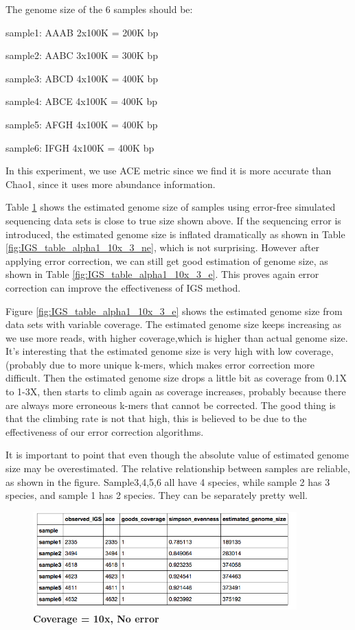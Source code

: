 \documentclass{article}
\begin{document}
The genome size of the 6 samples should be:

sample1: AAAB 2x100K = 200K bp

sample2: AABC 3x100K = 300K bp

sample3: ABCD 4x100K = 400K bp

sample4: ABCE 4x100K = 400K bp

sample5: AFGH 4x100K = 400K bp

sample6: IFGH 4x100K = 400K bp

In this experiment, we use ACE metric since we find it is more accurate than Chao1, since it uses more abundance information.

Table \ref{fig:IGS_table_alpha1_10x_0} shows the estimated genome size of samples using error-free simulated sequencing data sets
is close to true size shown above. If the sequencing error is introduced, the estimated genome size is inflated dramatically as shown in Table \ref{fig:IGS_table_alpha1_10x_3_ne}, which is 
not surprising. However after applying error correction, we can still get good estimation of genome size, as shown in Table \ref{fig:IGS_table_alpha1_10x_3_e}.
This proves again error correction can improve the effectiveness of IGS method.


Figure \ref{fig:IGS_table_alpha1_10x_3_e} shows the estimated genome size from data sets with variable coverage.
The estimated genome size keeps increasing as we use more reads, with higher coverage,which is  higher than actual genome size.
It's interesting that the estimated genome size is very high with low coverage, (probably due to more unique k-mers, which makes error correction more difficult. Then the estimated genome size drops a little bit as coverage from 0.1X to 1-3X, then starts to climb again as coverage increases, probably because there are always more erroneous k-mers that cannot be corrected. The good thing is that the climbing rate is not that high, this is believed to be due to the effectiveness of our error correction algorithms.

It is important to point that even though the absolute value of estimated genome size may be overestimated. The relative relationship between samples are reliable, as shown in the figure. Sample3,4,5,6 all have 4 species, while sample 2 has 3 species, and sample 1 has 2 species. They can be separately pretty well.


\begin{figure}[!ht]
 \centerline{\includegraphics[width=4in]{./figures/IGS_table_alpha1_10x_0.png}}
\caption{\bf Coverage = 10x, No error}
\label{fig:IGS_table_alpha1_10x_0}
\end{figure}
\end{document}
